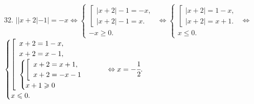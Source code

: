 32. $||x+2|-1|=-x\Leftrightarrow\begin{cases}\left[\begin{array}{l}|x+2|-1=-x,\\ |x+2|-1=x.\end{array}\right.\\ -x\geqslant0.\end{cases}
\Leftrightarrow\begin{cases}\left[\begin{array}{l}|x+2|=1-x,\\ |x+2|=x+1.\end{array}\right.\\ x\leqslant0.\end{cases}
\Leftrightarrow$\\$ \begin{cases}\left[\begin{array}{l}x+2=1-x,\\ x+2=x-1,\\ \begin{cases}\left[\begin{array}{l}x+2=x+1,\\ x+2=-x-1\end{array}\right.\\ x+1\geqslant0\end{cases}\end{array}\right.\\ x\leqslant0.\end{cases}\Leftrightarrow x=-\cfrac{1}{2}.$\\
